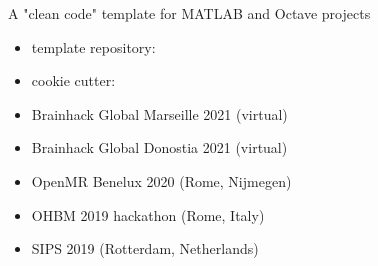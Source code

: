  A "clean code" template for MATLAB and Octave projects 
\begin{itemize}
    \item template repository: 
    \item cookie cutter: 
\end{itemize}

\vspace{5mm}



\begin{itemize}
    \item Brainhack Global Marseille 2021 (virtual) 
    \item Brainhack Global Donostia 2021 (virtual) 
    \item OpenMR Benelux 2020 (Rome, Nijmegen) 
    \item OHBM 2019 hackathon (Rome, Italy) 
\end{itemize}

\begin{itemize}
    \item SIPS 2019 (Rotterdam, Netherlands)
\end{itemize}
